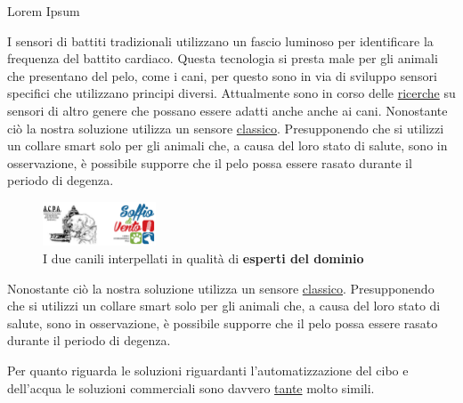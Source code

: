 \begin{tcolorbox}[width=12.1cm]
\begin{frame}{Lorem Ipsum}
    \begin{multicols}{2} %
            I sensori di battiti tradizionali utilizzano un fascio luminoso per identificare la frequenza del battito cardiaco. Questa tecnologia si presta male per gli animali che presentano del pelo, come i cani, per questo sono in via di sviluppo sensori specifici che utilizzano principi diversi. Attualmente sono in corso delle
            \href{https://vcs.vetmed.wsu.edu/research/clinical-studies/clinincal-studies-detail/vcs-clinical-studies/2017/06/28/new-ecg-technology}{ricerche} su sensori di altro genere che possano essere adatti anche anche ai cani.
            Nonostante ciò la nostra soluzione utilizza un sensore
            \href{https://www.amazon.it/Haljia-Sensore-frequenza-cardiaca-Raspberry/dp/B01CBGH4N6}{classico}. Presupponendo che si utilizzi un collare smart solo per gli animali che, a causa del loro stato di salute, sono in osservazione, è possibile supporre che il pelo possa essere rasato durante il periodo di degenza.

        \begin{figure}[H]
            \caption{I due canili interpellati in qualità di \textbf{esperti del dominio}}
            \label{fig:doggos}
            \centering
            \includegraphics[width=0.3\textwidth]{Images/canili.png}
        \end{figure}
    \end{multicols}
\end{frame}
\end{tcolorbox}

Nonostante ciò la nostra soluzione utilizza un sensore
\href{https://www.amazon.it/Haljia-Sensore-frequenza-cardiaca-Raspberry/dp/B01CBGH4N6}{classico}. Presupponendo che si utilizzi un collare smart solo per gli animali che, a causa del loro stato di salute, sono in osservazione, è possibile supporre che il pelo possa essere rasato durante il periodo di degenza.

Per quanto riguarda le soluzioni riguardanti l'automatizzazione del cibo e dell'acqua le soluzioni commerciali sono davvero \href{https://www.fruugo.it/alimentatore-automatico-per-animali-domestici-a-43-l-capacita-alimentatore-intelligente-per-alimentazione-intelligente-per-lalimentazione-del-tempo-e-razionale-con-telecamera-telecomandato-tipo-di-lusso/p-55093501-111996468?language=it&ac=croud}{tante} molto simili.


